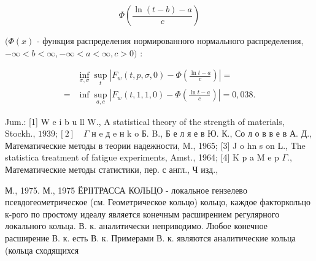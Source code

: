 \documentclass[10pt]{article}
\begin{document}
\[

\Phi\left(\frac{\ln (t-b)-a}{c}\right)

\]



$(\Phi(x)$ - функция распределения нормированного нормального распределения, $-\infty<b<\infty,-\infty<a<\infty, c>0)$ :



\[

\begin{aligned}

& \inf _{\sigma, \sigma} \sup _{t}\left|F_{w}(t, p, \sigma, 0)-\Phi\left(\frac{\ln t-a}{c}\right)\right|= \\

= & \inf \sup _{a, c}\left|F_{w}(t, 1,1,0)-\Phi\left(\frac{\ln t-a}{c}\right)\right|=0,038 .

\end{aligned}

\]



Jum.: [1] W e i b u ll W., A statistical theory of the strength of materials, Stockh., $1939 ;[2] \quad \Gamma$ н e д e н k o Б. B., Б е л я е в Ю. К., Со л о в в е в А. Д., Математические методы в теории надежности, M., 1965; [3] J o hn s on L., The statistica treatment of fatigue experiments, Amst., 1964; [4] K p a M e p $\Gamma .$, Математические методы статистики, пер. с англ., Ч изд.,

М., 1975. М., 1975 ЁРІІТРАССА КОЛЬЦО - локальное гензелево псевдогеометрическое (см. Геометрическое кольцо) кольцо, каждое факторкольцо к-рого по простому идеалу является конечным расширением регулярного локального кольца. В. к. аналитически неприводимо. Любое конечное расширение В. к. есть В. к. Примерами В. к. являются аналитические кольца (кольца сходящихся
\end{document}
